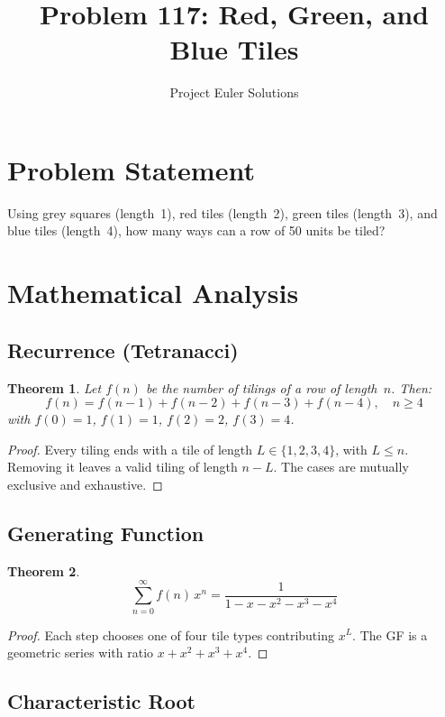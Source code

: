 \documentclass[11pt]{article}
\title{Problem 117: Red, Green, and Blue Tiles}
\author{Project Euler Solutions}
\date{}
\newtheorem{theorem}{Theorem}
\begin{document}
\maketitle

\section{Problem Statement}
Using grey squares (length~1), red tiles (length~2), green tiles (length~3), and blue tiles (length~4), how many ways can a row of 50 units be tiled?

\section{Mathematical Analysis}

\subsection{Recurrence (Tetranacci)}

\begin{theorem}
Let $f(n)$ be the number of tilings of a row of length~$n$. Then:
\[
f(n) = f(n-1) + f(n-2) + f(n-3) + f(n-4), \quad n \ge 4
\]
with $f(0) = 1$, $f(1) = 1$, $f(2) = 2$, $f(3) = 4$.
\end{theorem}

\begin{proof}
Every tiling ends with a tile of length $L \in \{1,2,3,4\}$, with $L \le n$. Removing it leaves a valid tiling of length $n - L$. The cases are mutually exclusive and exhaustive.
\end{proof}

\subsection{Generating Function}

\begin{theorem}
\[
\sum_{n=0}^{\infty} f(n)\, x^n = \frac{1}{1 - x - x^2 - x^3 - x^4}
\]
\end{theorem}

\begin{proof}
Each step chooses one of four tile types contributing $x^L$. The GF is a geometric series with ratio $x + x^2 + x^3 + x^4$.
\end{proof}

\subsection{Characteristic Root}
\end{document}
